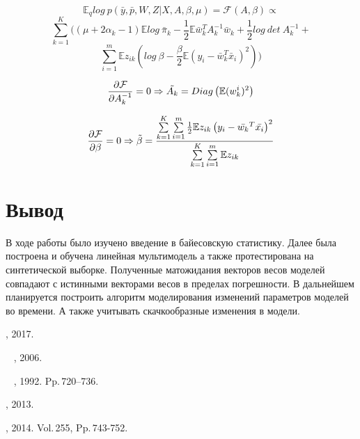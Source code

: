 \documentclass[12pt,twoside]{article}
\begin{document}
$$\mathbb{E}_q log~p(\bar{y}, \bar{p}, W, Z|X, A, \beta, \mu) = \mathcal{F}(A, \beta) \propto$$
$$\sum \limits_{k = 1}^K ((\mu +2\alpha_k - 1)\mathbb{E} log~\bar \pi_k - \frac{1}{2} \mathbb{E}\bar w_k^T A_k^{-1} \bar w_k + \frac{1}{2} log~det~A_k^{-1} +$$
$$\sum \limits_{i=1}^{m} \mathbb{E}z_{ik}(log~\beta - \frac{\beta}{2} \mathbb{E}(y_i - \bar w_k^T \bar x_i)^2))$$

$$\frac{\partial \mathcal{F}}{\partial A_k^{-1}} = 0 \Rightarrow \Tilde{A_k} = Diag\left(\mathbb{E} (w_k^i)^2\right)$$

$$\frac{\partial \mathcal{F}}{\partial \beta} = 0 \Rightarrow \Tilde{\beta}  =  \frac{\sum \limits_{k=1}^{K} \sum \limits_{i=1}^{m} \frac{1}{2} \mathbb{E}z_{ik} \left(y_i - \bar{w_k}^T \bar{x_i} \right)^2}{\sum \limits_{k=1}^{K} \sum \limits_{i=1}^{m} \mathbb{E}z_{ik}}$$

\section{Вывод}
В ходе работы было изучено введение в байесовскую статистику. Далее была построена и обучена линейная мультимодель а также протестирована на синтетической выборке. Полученные матожидания векторов весов моделей совпадают с истинными векторами весов в пределах погрешности. В дальнейшем планируется построить алгоритм моделирования изменений параметров моделей во времени. А также учитывать скачкообразные изменения в модели.\\


\begin{thebibliography}{99}
    , 2017.

    ~
    , 2006.

    ~
    , 1992. Pp.\,720--736.

    , 2013.

    , 2014. Vol.\,255, Pp.\,743-752.
\end{thebibliography}
\end{document}
